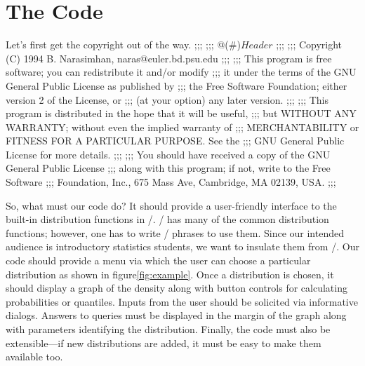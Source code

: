 \section{The Code} 
\label{sec:code}
Let's first get the copyright out of the way.
\nwenddocs{}\endmoddef
;;;
;;; @(#)$Header$
;;;
;;; Copyright (C) 1994 B. Narasimhan, naras@euler.bd.psu.edu
;;;
;;; This program is free software; you can redistribute it and/or modify
;;; it under the terms of the GNU General Public License as published by
;;; the Free Software Foundation; either version 2 of the License, or
;;; (at your option) any later version.
;;;
;;; This program is distributed in the hope that it will be useful,
;;; but WITHOUT ANY WARRANTY; without even the implied warranty of
;;; MERCHANTABILITY or FITNESS FOR A PARTICULAR PURPOSE.  See the
;;; GNU General Public License for more details.
;;;
;;; You should have received a copy of the GNU General Public License
;;; along with this program; if not, write to the Free Software
;;; Foundation, Inc., 675 Mass Ave, Cambridge, MA 02139, USA.
;;;

\eatline
{}\nwendcode{}\nwdocspar
So, what must our code do? It should provide a user-friendly interface to
the built-in distribution functions in \xls/. \xls/ has many of the
common distribution functions; however, one has to write \lisp/
phrases to use them.  Since our intended audience is introductory
statistics students, we want to insulate them from \lisp/. Our code
should provide a menu via which the user can choose a particular
distribution as shown in figure\ref{fig:example}. Once a distribution
is chosen, it should display a graph of the density along with button
controls for calculating probabilities or quantiles.  Inputs from the
user should be solicited via informative dialogs.  Answers to queries
must be displayed in the margin of the graph along with parameters
identifying the distribution.  Finally, the code must also be
extensible---if new distributions are added, it must be easy to make
them available too.

